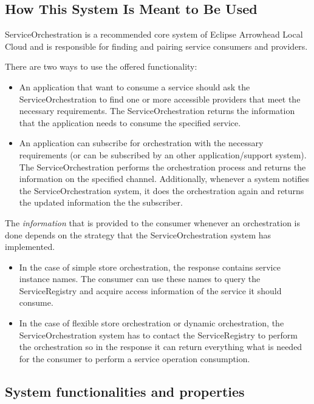 \documentclass[a4paper]{arrowhead}
\begin{document}
\subsection{How This System Is Meant to Be Used}
\label{sec:use}

ServiceOrchestration is a recommended core system of Eclipse Arrowhead Local Cloud and is responsible for finding and pairing service consumers and providers. 

There are two ways to use the offered functionality:

\begin{itemize}
    \item An application that want to consume a service should ask the ServiceOrchestration to find one or more accessible providers that meet the necessary requirements. The ServiceOrchestration returns the information that the application needs to consume the specified service.
    \item An application can subscribe for orchestration with the necessary requirements (or can be subscribed by an other application/support system). The ServiceOrchestration performs the orchestration process and returns the information on the specified channel. Additionally, whenever a system notifies the ServiceOrchestration system, it does the orchestration again and returns the updated information the the subscriber.
\end{itemize}

The \textit{information} that is provided to the consumer whenever an orchestration is done depends on the strategy that the ServiceOrchestration system has implemented.

\begin{itemize}
    \item In the case of simple store orchestration, the response contains service instance names. The consumer can use these names to query the ServiceRegistry and acquire access information of the service it should consume.
    \item In the case of flexible store orchestration or dynamic orchestration, the ServiceOrchestration system has to contact the ServiceRegistry to perform the orchestration so in the response it can return everything what is needed for the consumer to perform a service operation consumption.
\end{itemize}

\subsection{System functionalities and properties}
\label{sec:properties}
\end{document}
